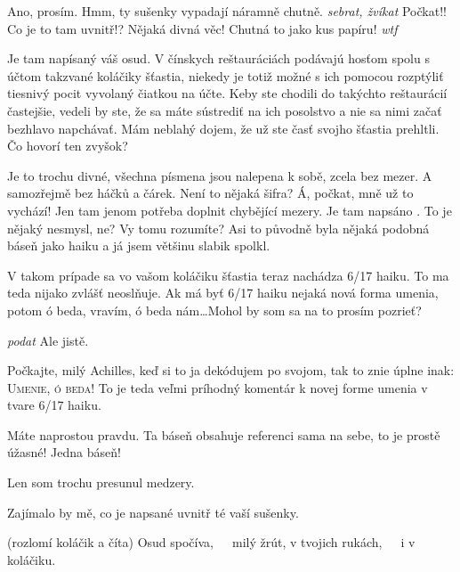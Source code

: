\documentclass[12pt]{article}
\begin{document}
\begin{description}[itemsep=0pt]
\item[A:] Ano, prosím. Hmm, ty sušenky vypadají náramně chutně. \textit{sebrat, žvíkat}
    Počkat!! Co je to tam uvnitř!? Nějaká divná věc! Chutná to jako kus papíru! \textit{wtf}

\item[Ž:] Je tam napísaný váš osud. V čínskych reštauráciách podávajú hosťom spolu s účtom 
    takzvané koláčiky šťastia, niekedy je totiž možné s ich pomocou rozptýliť tiesnivý
    pocit vyvolaný čiatkou na účte. Keby ste chodili do takýchto reštaurácií častejšie, 
    vedeli by ste, že sa máte sústrediť na ich posolstvo a nie sa nimi začať bezhlavo 
    napchávať. Mám neblahý dojem, že už ste časť svojho šťastia prehltli. Čo hovorí ten zvyšok?

\item[A:] Je to trochu divné, všechna písmena jsou nalepena k sobě, zcela bez mezer.
    A samozřejmě bez háčků a čárek. Není to nějaká šifra? Á, počkat, mně už to vychází!
    Jen tam jenom potřeba doplnit chybějící mezery. Je tam napsáno .
    To je nějaký nesmysl, ne? Vy tomu rozumíte? Asi to původně byla nějaká podobná báseň
    jako haiku a já jsem většinu slabik spolkl.

\item[Ž:] V takom prípade sa vo vašom koláčiku šťastia teraz nachádza 6/17 haiku. To ma 
    teda nijako zvlášť neoslňuje. Ak má byť 6/17 haiku nejaká nová forma umenia, potom 
    ó beda, vravím, ó beda nám\dots Mohol by som sa na to prosím pozrieť?

\item[A:] \textit{podat} Ale jistě.

\item[Ž:] Počkajte, milý Achilles, keď si to ja dekódujem po svojom, tak to znie úplne 
    inak: \textsc{Umenie, ó beda!} To je teda veľmi príhodný komentár k novej forme 
    umenia v tvare 6/17 haiku.

\item[A:] Máte naprostou pravdu. Ta báseň obsahuje referenci sama na sebe, to je prostě
    úžasné! Jedna báseň!

\item[Ž:] Len som trochu presunul medzery.

\item[A:] Zajímalo by mě, co je napsané uvnitř té vaší sušenky.

\item[Ž:] (rozlomí koláčik a číta) Osud spočíva,\ \ \ milý žrút, v tvojich rukách,\ \ \ i v koláčiku.


\end{description}
\end{document}
